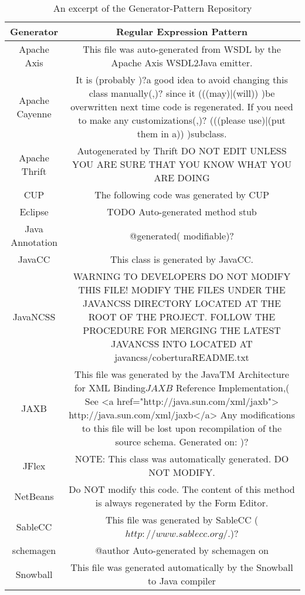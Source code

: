 \setlength{\extrarowheight}{0.2em}
\begin{table}
	\caption{An excerpt of the Generator-Pattern Repository}
	\label{table:generatorPatternRepository}
	\begin{tabularx}{\textwidth}{c|C}
		\textbf{Generator} & \textbf{Regular Expression Pattern} \\
		\hline
		Apache Axis & This file was auto-generated from WSDL by the Apache Axis WSDL2Java emitter. \\
		Apache Cayenne & It is (probably )?a good idea to avoid changing this class manually(,)? since it (((may)|(will)) )be overwritten next time code is regenerated. If you need to make any customizations(,)? (((please use)|(put them in a)) )subclass. \\
		Apache Thrift & Autogenerated by Thrift DO NOT EDIT UNLESS YOU ARE SURE THAT YOU KNOW WHAT YOU ARE DOING \\
		CUP & The following code was generated by CUP \version \timestamp \\
		Eclipse & TODO Auto-generated method stub \\
		Java Annotation & @generated( modifiable)? \\
		JavaCC & This class is generated by JavaCC. \\
		JavaNCSS & WARNING TO \project DEVELOPERS DO NOT MODIFY THIS FILE! MODIFY THE FILES UNDER THE JAVANCSS DIRECTORY LOCATED AT THE ROOT OF THE \project PROJECT. FOLLOW THE PROCEDURE FOR MERGING THE LATEST JAVANCSS INTO \project LOCATED AT javancss/coberturaREADME.txt \\
		JAXB & This file was generated by the JavaTM Architecture for XML Binding\(JAXB\) Reference Implementation,( \version See <a href="http://java.sun.com/xml/jaxb"> http://java.sun.com/xml/jaxb</a> Any modifications to this file will be lost upon recompilation of the source schema. Generated on: \timestamp)? \\
		JFlex & NOTE: This class was automatically generated. DO NOT MODIFY. \\
		NetBeans & Do NOT modify this code. The content of this method is always regenerated by the Form Editor. \\
		SableCC & This file was generated by SableCC (\(http://www.sablecc.org/\).)? \\
		schemagen & @author Auto-generated by schemagen on \timestamp \\
		Snowball & This file was generated automatically by the Snowball to Java compiler
		
		
	\end{tabularx}
\end{table}
\setlength{\extrarowheight}{0em}